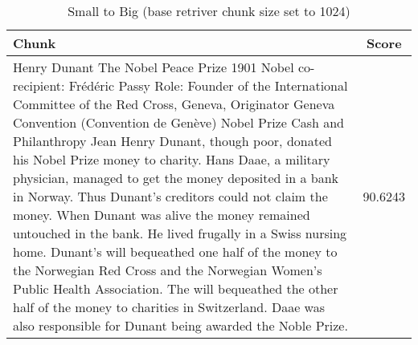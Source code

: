 \begin{table}[h!]
    \footnotesize
    \begin{xltabular}{\linewidth}{X|c}
        \toprule
        \textbf{Chunk}                                                                                                                                                                                                                                                                                                                                                                                                                                                                                                                                                                                                                                                                                                                                                                                                                                                                                                                                                                                                                                                                                                                       & \textbf{Score} \\
        \midrule
        Henry Dunant The Nobel Peace Prize 1901 Nobel co-recipient: Frédéric Passy Role: Founder of the International Committee of the Red Cross, Geneva, Originator Geneva Convention (Convention de Genève) Nobel Prize Cash and Philanthropy Jean Henry Dunant, though poor, donated his Nobel Prize money to charity. Hans Daae, a military physician, managed to get the money deposited in a bank in Norway. Thus Dunant’s creditors could not claim the money. When Dunant was alive the money remained untouched in the bank. He lived frugally in a Swiss nursing home.  Dunant’s will bequeathed one half of the money to the Norwegian Red Cross and the Norwegian Women’s Public Health Association. The will bequeathed the other half of the money to charities in Switzerland.  Daae was also responsible for Dunant being awarded the Noble Prize. & 90.6243\\
        \bottomrule
    \end{xltabular}
    \caption{Small to Big (base retriver chunk size set to 1024)}
    \label{tab:table-small2big}
\end{table}

